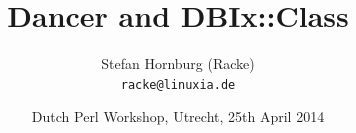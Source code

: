 \usepackage[utf8]{inputenc}
\usepackage[T1]{fontenc}
\usepackage{mathptmx}
\usepackage[scaled=.90]{helvet}
\usepackage{courier}
\usepackage{caption}
\captionsetup{labelformat=empty,labelsep=none}
\usepackage{verbatim}
\usepackage{hyperref}
\usepackage{listings}
\usepackage{ulem}
\lstset{language=Perl,basicstyle=\normalsize,tabsize=3,showstringspaces=false}

\title{Dancer and DBIx::Class}
\author[racke]{Stefan Hornburg (Racke)\\ \texttt{racke@linuxia.de}}
\date{Dutch Perl Workshop, Utrecht, 25th April 2014}


\maketitle{}

\begin{frame}
  \titlepage
\end{frame}

\tableofcontents








